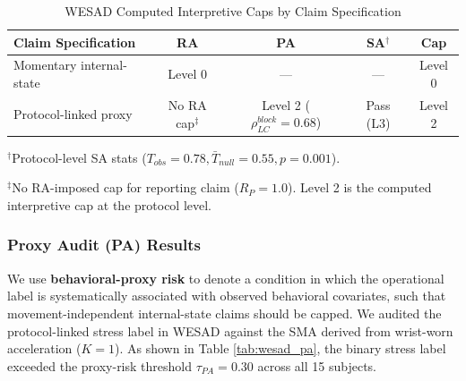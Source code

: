 \documentclass[journal]{IEEEtran}
\begin{document}
\begin{table}[h]
\caption{WESAD Computed Interpretive Caps by Claim Specification}
\label{tab:wesad_claim_outcomes}
\centering
\begin{tabular}{@{}lcccc@{}}
\toprule
\textbf{Claim Specification} & \textbf{RA} & \textbf{PA} & \textbf{SA$^\dagger$} & \textbf{Cap} \\
\midrule
Momentary internal-state & Level 0 & --- & --- & Level 0 \\
Protocol-linked proxy    & No RA cap$^\ddagger$ & Level 2 ($\rho^{block}_{LC}=0.68$) & Pass (L3) & Level 2 \\
\bottomrule
\end{tabular}
\smallskip
\begin{minipage}{\columnwidth}
\small $^\dagger$Protocol-level SA stats ($T_{obs}=0.78, \bar{T}_{null}=0.55, p = 0.001$).
\end{minipage}
\smallskip
\begin{minipage}{\columnwidth}
\small $^\ddagger$No RA-imposed cap for reporting claim ($R_P=1.0$). Level 2 is the computed interpretive cap at the protocol level.
\end{minipage}
\end{table}

\subsubsection{Proxy Audit (PA) Results}
We use \textbf{behavioral-proxy risk} to denote a condition in which the operational label is systematically associated with observed behavioral covariates, such that movement-independent internal-state claims should be capped. We audited the protocol-linked stress label in WESAD against the SMA derived from wrist-worn acceleration ($K=1$). As shown in Table \ref{tab:wesad_pa}, the binary stress label exceeded the proxy-risk threshold $\tau_{PA} = 0.30$ across all 15 subjects.
\end{document}
